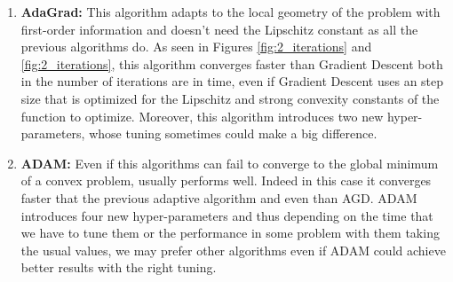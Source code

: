 \documentclass[letterpaper]{article}
\providecommand{\1}{\mathbf{1}}
\providecommand{\0}{\mathbf{0}}
\begin{document}
\begin{enumerate}[label=(\alph*)]
    \item \textbf{AdaGrad: }This algorithm adapts to the local geometry of the problem with first-order information and doesn't need the Lipschitz constant as all the previous algorithms do. As seen in Figures \ref{fig:2_iterations} and \ref{fig:2_iterations}, this algorithm converges faster than Gradient Descent both in the number of iterations are in time, even if Gradient Descent uses an step size that is optimized for the Lipschitz and strong convexity constants of the function to optimize. Moreover, this algorithm introduces two new hyper-parameters, whose tuning sometimes could make a big difference.
    
    \item \textbf{ADAM: }Even if this algorithms can fail to converge to the global minimum of a convex problem, usually performs well. Indeed in this case it converges faster that the previous adaptive algorithm and even than AGD. ADAM introduces four new hyper-parameters and thus depending on the time that we have to tune them or the performance in some problem with them taking the usual values, we may prefer other algorithms even if ADAM could achieve better results with the right tuning.
\end{enumerate}
\end{document}
